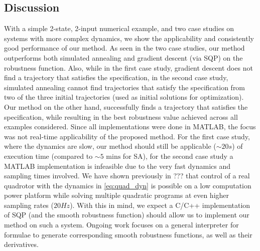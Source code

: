 \subsection{Discussion}
With a simple 2-state, 2-input numerical example, and two case studies on systems with more complex dynamics, we show the applicability and consistently good performance of our method. As seen in the two case studies, our method outperforms both simulated annealing and gradient descent (via SQP) on the robustness function. Also, while in the first case study, gradient descent does not find a trajectory that satisfies the specification, in the second case study, simulated annealing cannot find trajectories that satisfy the specification from two of the three initial trajectories (used as initial solutions for optimization). Our method on the other hand, successfully finds a trajectory that satisfies the specification, while resulting in the best robustness value achieved across all examples considered. 
Since all implementations were done in MATLAB, the focus was not real-time applicability of the proposed method. For the first case study, where the dynamics are slow, our method should still be applicable ($\sim 20s$) of execution time (compared to $\sim 5 \text{ mins}$ for SA), for the second case study a MATLAB implementation is infeasible due to the very fast dynamics and sampling times involved. We have shown previously in ??? that control of a real quadrotor with the dynamics in \eqref{eq:quad_dyn} is possible on a low computation power platform while solving multiple quadratic programs at even higher sampling rates ($20Hz$). With this in mind, we expect a C/C++ implementation of SQP (and the smooth robustness function) should allow us to implement our method on such a system. Ongoing work focuses on a general interpreter for formulae to generate corresponding smooth robustness functions, as well as their derivatives.